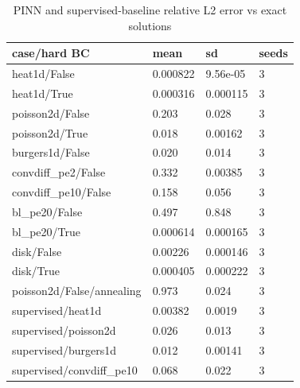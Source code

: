 \begin{table}[t]\centering\small\caption{PINN and supervised-baseline relative L2 error vs exact solutions}\label{tab:phase2}
\begin{tabular}{llll}\toprule
case/hard BC & mean & sd & seeds \\ \midrule
heat1d/False & 0.000822 & 9.56e-05 & 3 \\
heat1d/True & 0.000316 & 0.000115 & 3 \\
poisson2d/False & 0.203 & 0.028 & 3 \\
poisson2d/True & 0.018 & 0.00162 & 3 \\
burgers1d/False & 0.020 & 0.014 & 3 \\
convdiff\_pe2/False & 0.332 & 0.00385 & 3 \\
convdiff\_pe10/False & 0.158 & 0.056 & 3 \\
bl\_pe20/False & 0.497 & 0.848 & 3 \\
bl\_pe20/True & 0.000614 & 0.000165 & 3 \\
disk/False & 0.00226 & 0.000146 & 3 \\
disk/True & 0.000405 & 0.000222 & 3 \\
poisson2d/False/annealing & 0.973 & 0.024 & 3 \\
supervised/heat1d & 0.00382 & 0.0019 & 3 \\
supervised/poisson2d & 0.026 & 0.013 & 3 \\
supervised/burgers1d & 0.012 & 0.00141 & 3 \\
supervised/convdiff\_pe10 & 0.068 & 0.022 & 3 \\
\bottomrule\end{tabular}\end{table}

